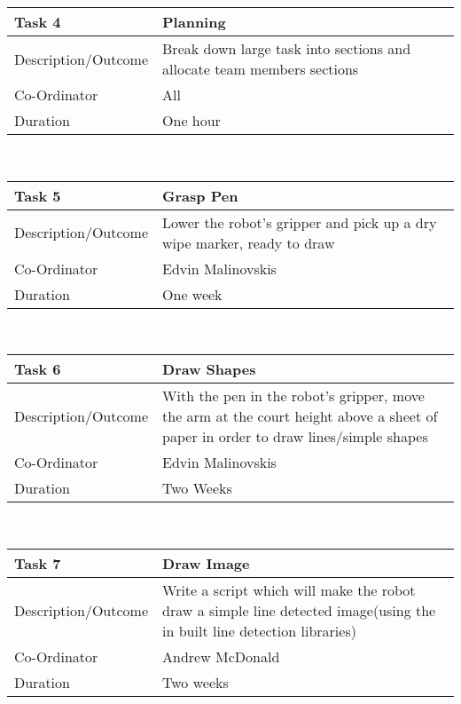 \documentclass{l3proj}
\begin{document}
\vspace{2mm}

\begin{tabular}{|p{5cm}|p{9cm}|}
\hline
Task 4 & Planning \\
\hline
Description/Outcome & Break down large task into sections and allocate team members sections\\
\hline
Co-Ordinator & All\\
\hline
Duration & One hour\\
\hline
\end{tabular}\\

\vspace{2mm}

\begin{tabular}{|p{5cm}|p{9cm}|}
\hline
Task 5  & Grasp Pen\\
\hline
Description/Outcome & Lower the robot's gripper and pick up a dry wipe marker, ready to draw\\
\hline
Co-Ordinator & Edvin Malinovskis\\
\hline
Duration & One week\\
\hline
\end{tabular}\\

\vspace{2mm}

\begin{tabular}{|p{5cm}|p{9cm}|}
\hline
Task 6 & Draw Shapes\\
\hline
Description/Outcome & With the pen in the robot's gripper, move the arm at the court height above a sheet of paper in order to draw lines/simple shapes \\
\hline
Co-Ordinator & Edvin Malinovskis\\
\hline
Duration & Two Weeks\\
\hline
\end{tabular}\\

\vspace{2mm}

\begin{tabular}{|p{5cm}|p{9cm}|}
\hline
Task 7 & Draw Image  \\
\hline
Description/Outcome & Write a script which will make the robot draw a simple line detected image(using the in built line detection libraries)\\
\hline
Co-Ordinator & Andrew McDonald\\
\hline
Duration & Two weeks\\
\hline
\end{tabular}\\
\end{document}
